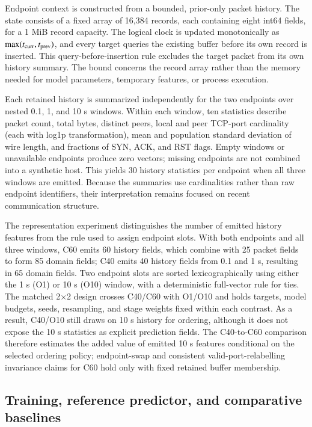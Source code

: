 \documentclass[final,3p,10pt,nopreprintline]{elsarticle}
\begin{document}
Endpoint context is constructed from a bounded, prior-only packet history. The state consists of a fixed array of 16,384 records, each containing eight int64 fields, for a 1 MiB record capacity. The logical clock is updated monotonically as \(\max(t_{\rm curr},t_{\rm prev})\), and every target queries the existing buffer before its own record is inserted. This query-before-insertion rule excludes the target packet from its own history summary. The bound concerns the record array rather than the memory needed for model parameters, temporary features, or process execution.

Each retained history is summarized independently for the two endpoints over nested 0.1, 1, and 10 s windows. Within each window, ten statistics describe packet count, total bytes, distinct peers, local and peer TCP-port cardinality (each with log1p transformation), mean and population standard deviation of wire length, and fractions of SYN, ACK, and RST flags. Empty windows or unavailable endpoints produce zero vectors; missing endpoints are not combined into a synthetic host. This yields 30 history statistics per endpoint when all three windows are emitted. Because the summaries use cardinalities rather than raw endpoint identifiers, their interpretation remains focused on recent communication structure.

The representation experiment distinguishes the number of emitted history features from the rule used to assign endpoint slots. With both endpoints and all three windows, C60 emits 60 history fields, which combine with 25 packet fields to form 85 domain fields; C40 emits 40 history fields from 0.1 and 1 s, resulting in 65 domain fields. Two endpoint slots are sorted lexicographically using either the 1 s (O1) or 10 s (O10) window, with a deterministic full-vector rule for ties. The matched 2\(\times\)2 design crosses C40/C60 with O1/O10 and holds targets, model budgets, seeds, resampling, and stage weights fixed within each contrast. As a result, C40/O10 still draws on 10 s history for ordering, although it does not expose the 10 s statistics as explicit prediction fields. The C40-to-C60 comparison therefore estimates the added value of emitted 10 s features conditional on the selected ordering policy; endpoint-swap and consistent valid-port-relabelling invariance claims for C60 hold only with fixed retained buffer membership.

\subsection{Training, reference predictor, and comparative baselines}
\end{document}
